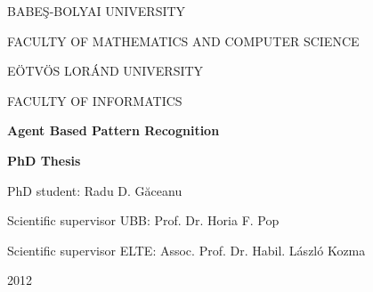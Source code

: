 \documentclass[a4paper, 11pt, english]{report}
\begin{document}
\begin{titlepage}
\sloppy
\begin{center}
\Large{BABE\c{S}-BOLYAI UNIVERSITY}

\Large{FACULTY OF MATHEMATICS AND COMPUTER SCIENCE}

\Large{E\"{O}TV\"{O}S LOR\'{A}ND UNIVERSITY}

\Large{FACULTY OF INFORMATICS}
 

\vspace{8cm}
\Huge \textbf{Agent Based Pattern Recognition}

\vspace{1.3cm}
\Large \textbf{PhD Thesis}
\end{center}
\vspace{4cm}
\begin{flushright}
\Large{PhD student: Radu D. G\u{a}ceanu}

\Large{Scientific supervisor UBB: Prof. Dr. Horia F. Pop}

\Large{Scientific supervisor ELTE: Assoc. Prof. Dr. Habil. L\'{a}szl\'{o} Kozma}
\end{flushright}

\vspace{2cm}

\begin{center}
\Large{2012}
\end{center}

\end{titlepage}




\tableofcontents
\listoffigures
\listoftables






%

%





%



%






\renewcommand\bibname{Bibliography}

%

%
 
\end{document}
